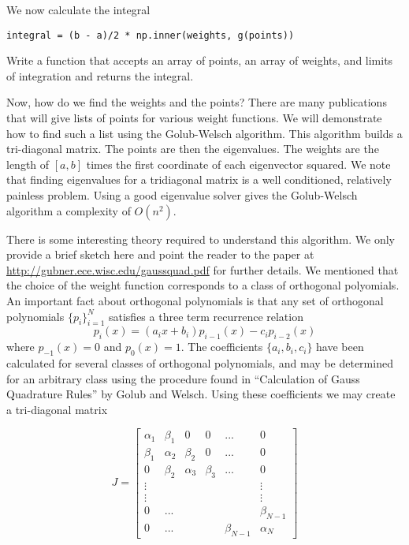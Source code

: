 We now calculate the integral

\begin{lstlisting}
integral = (b - a)/2 * np.inner(weights, g(points))
\end{lstlisting}

\begin{problem}

Write a function that accepts an array of points, an array of weights, and limits of integration and returns the integral.

\end{problem}

Now, how do we find the weights and the points?
There are many publications that will give lists of points for various weight functions.
We will demonstrate how to find such a list using the Golub-Welsch algorithm.
This algorithm builds a tri-diagonal matrix.
The points are then the eigenvalues.
The weights are the length of $\left[a, b\right]$ times the first coordinate of each eigenvector squared.
We note that finding eigenvalues for a tridiagonal matrix is a well conditioned, relatively painless problem.
Using a good eigenvalue solver gives the Golub-Welsch algorithm a complexity of $O(n^2)$.

There is some interesting theory required to understand this algorithm.
We only provide a brief sketch here and point the reader to the paper at \url{http://gubner.ece.wisc.edu/gaussquad.pdf} for further details.
We mentioned that the choice of the weight function corresponds to a class of orthogonal polyomials.
An important fact about orthogonal polynomials is that any set of orthogonal polynomials $\{p_i\}_{i=1}^N$ satisfies a three term recurrence relation
\[
p_i(x) = (a_ix + b_i)p_{i-1}(x) - c_ip_{i-2}(x)
\]
where $p_{-1}(x) = 0$ and $p_0(x) = 1$.
The coefficients $\{a_i, b_i, c_i\}$ have been calculated for several classes of orthogonal polynomials, and may be determined for an arbitrary class using the procedure found in ``Calculation of Gauss Quadrature Rules'' by Golub and Welsch.
Using these coefficients we may create a tri-diagonal matrix

\[
J = \begin{bmatrix}

\alpha_1 & \beta_1 & 0 & 0 & ... & 0 \\
\beta_1 & \alpha_2 & \beta_2 & 0 & ... & 0 \\
0 & \beta_2 & \alpha_3 & \beta_3 & ... & 0 \\
\vdots & & & & & \vdots \\
\vdots & & & & & \vdots \\
0 & ... & & & & \beta_{N-1} \\
0 & ... & & & \beta_{N-1} & \alpha_N

\end{bmatrix}
\]

